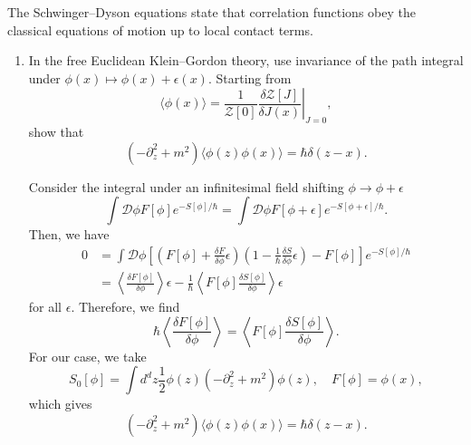 The Schwinger--Dyson equations state that correlation functions obey the
classical equations of motion up to local contact terms.

\begin{enumerate}[label=\alph*)]
    \item In the free Euclidean Klein--Gordon theory, use invariance of the path
    integral under $\phi(x)\mapsto\phi(x)+\epsilon(x)$. Starting from
    \begin{equation}
        \langle\phi(x)\rangle
        =\left.
        \frac{1}{\mathcal Z[0]}
        \frac{\delta\mathcal Z[J]}{\delta J(x)}
        \right|_{J=0},
    \end{equation}
    show that
    \begin{equation}
        (-\partial_z^2+m^2)
        \langle\phi(z)\phi(x)\rangle
        =\hbar\delta(z-x).
    \end{equation}
    \begin{solution}
        Consider the integral under an infinitesimal field shifting $\phi \to \phi +\epsilon$
        \begin{equation}
            \int\mathcal{D}\phi F[\phi]e^{-S[\phi]/\hbar} = \int \mathcal{D}\phi F[\phi+\epsilon]e^{-S[\phi+\epsilon]/\hbar}.
        \end{equation}
        Then, we have
        \begin{equation}
            \begin{aligned}
                0 &=\int \mathcal{D}\phi\left[\left(F[\phi] + \frac{\delta F}{\delta\phi}\epsilon\right)\left(1- \frac{1}{\hbar}\frac{\delta S}{\delta\phi}\epsilon\right) - F[\phi]\right]e^{-S[\phi]/\hbar}\\
                &=\left\langle\frac{\delta F[\phi]}{\delta\phi }\right\rangle\epsilon  -\frac{1}{\hbar} \left\langle F[\phi]\frac{\delta S[\phi]}{\delta \phi}\right\rangle\epsilon
            \end{aligned}
        \end{equation}
        for all $\epsilon$. Therefore, we find
        \begin{equation}
            \hbar \left\langle\frac{\delta F[\phi]}{\delta\phi }\right\rangle = \left\langle F[\phi]\frac{\delta S[\phi]}{\delta \phi}\right\rangle.
        \end{equation}
        For our case, we take
        \begin{equation}
            S_0[\phi] = \int d^dz \frac{1}{2}\phi(z)(-\partial_z^2 +m^2)\phi(z), \quad F[\phi] = \phi(x),
        \end{equation}
        which gives
        \begin{equation}
            (-\partial_z^2+m^2)
        \langle\phi(z)\phi(x)\rangle
        =\hbar\delta(z-x).
        \end{equation}
    \end{solution}


\end{enumerate}
